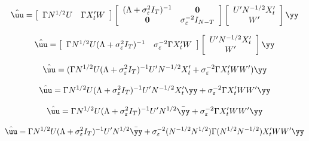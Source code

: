 \begin{equation}
    \hat{\uu} = 
    \left[\begin{array}{cc}
    \Gamma 
    N^{1/2}U & \Gamma 
    X_t'W 
\end{array}\right]
\left[ 
\begin{array}{cc}
    (\Lambda + \sigma_\varepsilon^2I_T)^{-1} & \mathbf{0} \\
    \mathbf{0} & \sigma_\varepsilon^{-2}I_{N-T}
\end{array}
\right]
\left[ 
\begin{array}{c}
     U' N^{-1/2} X_t'  \\
      W'
\end{array}\right]\yy
\end{equation}

\begin{equation}
    \hat{\uu} = 
    \left[\begin{array}{cc}
    \Gamma 
    N^{1/2}U (\Lambda + \sigma_\varepsilon^2I_T)^{-1} & \sigma_\varepsilon^{-2}\Gamma 
    X_t'W 
\end{array}\right]
\left[ 
\begin{array}{c}
     U' N^{-1/2} X_t'  \\
      W'
\end{array}\right]\yy
\end{equation}

\begin{equation}
    \hat{\uu} = 
   (\Gamma 
    N^{1/2}U (\Lambda + \sigma_\varepsilon^2I_T)^{-1}U' N^{-1/2} X_t'  + \sigma_\varepsilon^{-2}\Gamma 
    X_t'W W')\yy
\end{equation}

\begin{equation}
    \hat{\uu} = 
   \Gamma 
    N^{1/2}U (\Lambda + \sigma_\varepsilon^2I_T)^{-1}U' N^{-1/2} X_t'\yy  + \sigma_\varepsilon^{-2}\Gamma 
    X_t'W W'\yy
\end{equation}

\begin{equation}
    \hat{\uu} = 
   \Gamma 
    N^{1/2}U (\Lambda + \sigma_\varepsilon^2I_T)^{-1}U' N^{1/2} \bar{\yy}  + \sigma_\varepsilon^{-2}\Gamma 
    X_t'W W'\yy
\end{equation}

\begin{equation}
    \hat{\uu} = 
   \Gamma 
    N^{1/2}U (\Lambda + \sigma_\varepsilon^2I_T)^{-1}U' N^{1/2} \bar{\yy}  + \sigma_\varepsilon^{-2}(N^{-1/2}N^{1/2})\Gamma (N^{1/2} N^{-1/2})
    X_t'W W'\yy
\end{equation}

